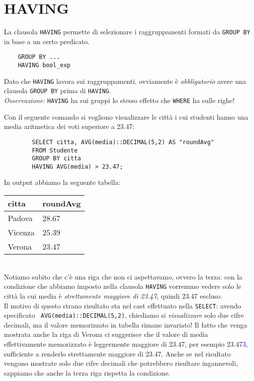 \documentclass[12pt,a4paper]{book}
\begin{document}
	\section{HAVING}
	La clausola \texttt{HAVING} permette di selezionare i raggruppamenti formati da \texttt{GROUP BY} in base a un certo predicato.
	\begin{lstlisting}
	GROUP BY ...
	HAVING bool_exp
	\end{lstlisting}
	Dato che \texttt{HAVING} lavora sui raggruppamenti, ovviamente è \textit{obbligatorio} avere una clausola \texttt{GROUP BY} prima di \texttt{HAVING}.\\
	\textit{Osservazione:} \texttt{HAVING} ha sui gruppi lo stesso effetto che \texttt{WHERE} ha sulle righe!\\
	\begin{tcolorbox}[enhanced jigsaw, breakable,title=Esempio particolare, title filled]
		Con il seguente comando si vogliono visualizzare le città i cui studenti hanno una media aritmetica dei voti superiore a 23.47:
		\begin{lstlisting}
		SELECT citta, AVG(media)::DECIMAL(5,2) AS "roundAvg" 
		FROM Studente
		GROUP BY citta
		HAVING AVG(media) > 23.47;
		\end{lstlisting}
		In output abbiamo la seguente tabella:\vspace{10px}\\
		\begin{tabular} {| l | l |}
			\hline
			citta & roundAvg\\
			\hline
			Padova & 28.67\\
			Vicenza & 25.39\\
			Verona & 23.47\\
			\hline
		\end{tabular}\vspace{10px}\\
		Notiamo subito che c'è una riga che non ci aspettavamo, ovvero la terza: con la condizione che abbiamo imposto nella clausola \texttt{HAVING} vorremmo vedere solo le città la cui media è \textit{strettamente maggiore di 23.47}, quindi 23.47 escluso.\\Il motivo di questo strano risultato sta nel cast effettuato nella \texttt{SELECT}: avendo specificato \texttt{ AVG(media)::DECIMAL(5,2)}, chiediamo si \textit{visualizzare} solo due cifre decimali, ma il valore memorizzato in tabella rimane invariato! Il fatto che venga mostrata anche la riga di Verona ci suggerisce che il valore  di media effettivamente memorizzato è leggermente maggiore di 23.47, per esempio 23.47\textcolor{blue}{3}, sufficiente a renderlo strettamente maggiore di 23.47. Anche se nel risultato vengono mostrate solo due cifre decimali che potrebbero risultare ingannevoli, sappiamo che anche la terza riga rispetta la condizione.
	\end{tcolorbox}
\end{document}
